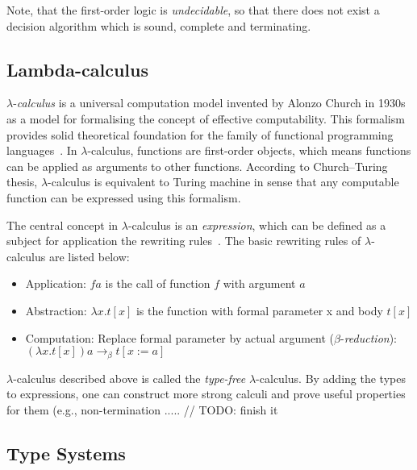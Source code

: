 \documentclass[article]{aaltoseries}
\begin{document}
Note, that the first-order logic is \textit{undecidable}, so that there does not exist a decision algorithm which is sound, complete and terminating.


\subsection{Lambda-calculus}

$\lambda$-\textit{calculus} is a universal computation model invented by Alonzo Church in 1930s as a model for formalising the concept of effective computability. This formalism provides solid theoretical foundation for the family of functional programming languages~\cite{Roj15}. In $\lambda$-calculus, functions are first-order objects, which means functions can be applied as arguments to other functions. According to Church–Turing thesis, $\lambda$-calculus is equivalent to Turing machine in sense that any computable function can be expressed using this formalism.

The central concept in $\lambda$-calculus is an \textit{expression}, which can be defined as a subject for application the rewriting rules~\cite{Bar88}. The basic rewriting rules of $\lambda$-calculus are listed below:

\begin{itemize}
\itemsep0em
	\item Application:
	$f a$ is the call of function $f$ with argument $a$
	
	\item Abstraction:
	$\lambda x.t[x]$ is the function with formal parameter x and body $t[x]$
	
	\item Computation:
	Replace formal parameter by actual argument ($\beta$-\textit{reduction}): \\
	$(\lambda x.t[x]) a \rightarrow_{\beta} t[x:=a]$
\end{itemize}

$\lambda$-calculus described above is called the \textit{type-free} $\lambda$-calculus. By adding the types to expressions, one can construct more strong calculi and prove useful properties for them (e.g., non-termination .....
// TODO: finish it


\subsection{Type Systems}
\end{document}
